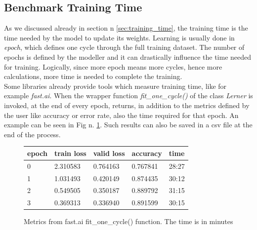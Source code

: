 \subsection{Benchmark Training Time}\label{b_trainig_time}
As we discussed already in section n \ref{sec:training_time}, the training time is the time needed by the model to update its weights. Learning is usually done in \textit{epoch}, which defines one cycle through the full training dataset. \cite{Afaq2020SignificanceOE} The number of epochs is defined by the modeller and it can drastically influence the time needed for training. Logically, since more epoch means more cycles, hence more calculations, more time is needed to complete the training.\\
Some libraries already provide tools which measure training time, like for example \textit{fast.ai}. When the wrapper function \textit{fit\_one\_cycle()} of the class \textit{Lerner} is invoked, at the end of every epoch, returns, in addition to the metrics defined by the user like accuracy or error rate, also the time required for that epoch. An example can be seen in Fig n. \ref{fig:m_fast}. Such results can also be saved in a csv file at the end of the process. \\
\begin{figure}[h]
\centering
\begin{tabular}{ p{1cm} p{2cm} p{2cm} p{2cm} p{2cm}   }
 epoch&train loss &valid loss & accuracy &time\\
 \hline
0	&2.310583	&0.764163	&0.767841	&28:27\\
1	&1.031493	&0.420149	&0.874435	&30:12\\
2	&0.549505	&0.350187	&0.889792	&31:15\\
3	&0.369313	&0.336940	&0.891599	&30:15\\

 \hline
\end{tabular}
\caption[Metrics from fast.ai fit\_one\_cycle() function]{Metrics from fast.ai fit\_one\_cycle() function. The time is in minutes}
\label{fig:m_fast}
\end{figure}


